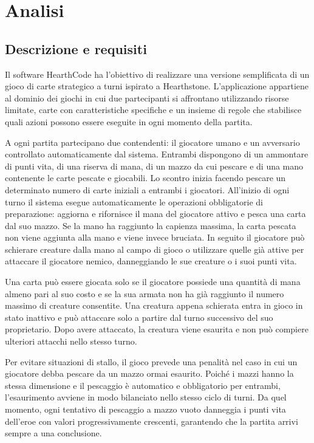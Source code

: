\chapter{Analisi}

\section{Descrizione e requisiti}

Il software HearthCode ha l'obiettivo di realizzare una versione semplificata di
un gioco di carte strategico a turni ispirato a Hearthstone. L'applicazione
appartiene al dominio dei giochi in cui due partecipanti si affrontano
utilizzando risorse limitate, carte con caratteristiche specifiche e un insieme
di regole che stabilisce quali azioni possono essere eseguite in ogni momento
della partita.

A ogni partita partecipano due contendenti: il giocatore umano e un avversario
controllato automaticamente dal sistema. Entrambi dispongono di un ammontare di
punti vita, di una riserva di mana, di un mazzo da cui pescare e di una mano
contenente le carte pescate e giocabili. Lo scontro inizia facendo pescare
un determinato numero di carte iniziali a entrambi i giocatori.
All'inizio di ogni turno il sistema esegue automaticamente le operazioni
obbligatorie di preparazione: aggiorna e rifornisce
il mana del giocatore attivo e pesca una carta dal suo mazzo. Se la mano ha
raggiunto la capienza massima, la carta pescata non viene aggiunta alla mano e
viene invece bruciata. In seguito il giocatore può schierare creature dalla
mano al campo di gioco o utilizzare quelle già attive per attaccare il
giocatore nemico, danneggiando le sue creature o i suoi punti vita.

Una carta può essere giocata solo se il giocatore possiede una quantità di mana
almeno pari al suo costo e se la sua armata non ha già raggiunto il numero massimo
di creature consentite. Una creatura appena schierata entra in gioco in stato
inattivo e può attaccare solo a partire dal turno successivo del suo
proprietario. Dopo avere attaccato, la creatura viene esaurita e non può
compiere ulteriori attacchi nello stesso turno.

Per evitare situazioni di stallo, il gioco prevede una penalità nel caso in cui
un giocatore debba pescare da un mazzo ormai esaurito. Poiché i mazzi hanno la
stessa dimensione e il pescaggio è automatico e obbligatorio per entrambi,
l'esaurimento avviene in modo bilanciato nello stesso ciclo di turni. Da quel
momento, ogni tentativo di pescaggio a mazzo vuoto danneggia i punti vita
dell'eroe con valori progressivamente crescenti, garantendo che la partita
arrivi sempre a una conclusione.

